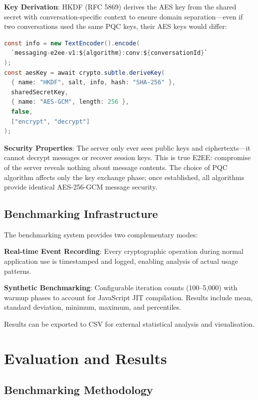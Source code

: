 \documentclass[11pt,a4paper]{article}
\begin{document}
\textbf{Key Derivation}: HKDF (RFC 5869) derives the AES key from the shared secret with conversation-specific context to ensure domain separation---even if two conversations used the same PQC keys, their AES keys would differ:

\begin{lstlisting}[language=Java, caption=HKDF Key Derivation]
const info = new TextEncoder().encode(
  `messaging-e2ee-v1:${algorithm}:conv:${conversationId}`
);
const aesKey = await crypto.subtle.deriveKey(
  { name: "HKDF", salt, info, hash: "SHA-256" },
  sharedSecretKey,
  { name: "AES-GCM", length: 256 },
  false,
  ["encrypt", "decrypt"]
);
\end{lstlisting}

\textbf{Security Properties}: The server only ever sees public keys and ciphertexts---it cannot decrypt messages or recover session keys. This is true E2EE: compromise of the server reveals nothing about message contents. The choice of PQC algorithm affects only the key exchange phase; once established, all algorithms provide identical AES-256-GCM message security.

\subsection{Benchmarking Infrastructure}

The benchmarking system provides two complementary modes:

\textbf{Real-time Event Recording}: Every cryptographic operation during normal application use is timestamped and logged, enabling analysis of actual usage patterns.

\textbf{Synthetic Benchmarking}: Configurable iteration counts (100--5,000) with warmup phases to account for JavaScript JIT compilation. Results include mean, standard deviation, minimum, maximum, and percentiles.

Results can be exported to CSV for external statistical analysis and visualisation.

\section{Evaluation and Results}

\subsection{Benchmarking Methodology}
\end{document}
